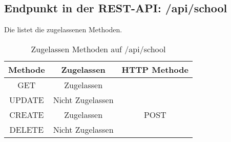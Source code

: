 \subsection{Endpunkt in der REST-API: /api/school}
Die  listet die zugelassenen Methoden. 

\begin{table}[!htbp]
	\begin{tabular}{|c|c|c|}
		\hline
			\textbf{Methode} & \textbf{Zugelassen} & \textbf{HTTP Methode} \\ \hline
			GET & Zugelassen &  \\ \hline
			UPDATE & Nicht Zugelassen & \\ \hline 
			CREATE & Zugelassen & POST \\ \hline  
			DELETE & Nicht Zugelassen & \\ \hline
	\end{tabular}

		\caption{Zugelassen Methoden auf /api/school}
		\label{tab:end:rest:api:school:meth}
\end{table}